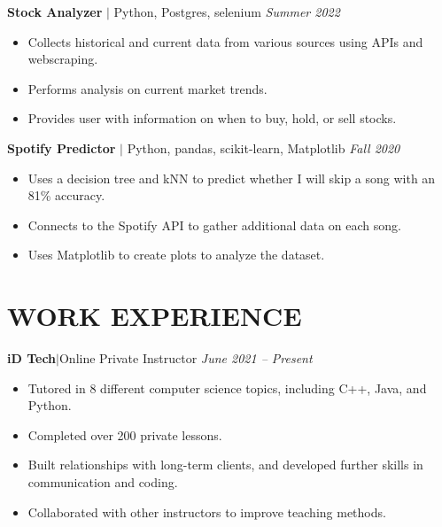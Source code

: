 \documentclass[11pt, a4paper, roman]{moderncv}
\newcommand{\project}[5]{
	\textbf{#1}
	$|$ #3 
	\hfill\textit{#4}
	#5
	\vspace{2mm}
}
\newcommand{\entry}[4]{
	\textbf{#1}\:$|$\:#2 
	\hfill\textit{#3}
	#4
	\vspace{2mm}
}
\begin{document}
{\project{Stock Analyzer}{}{Python, Postgres, selenium}{Summer 2022}
	{\begin{itemize}
		\item Collects historical and current data from various sources using APIs and webscraping.
		\item Performs analysis on current market trends.
		\item Provides user with information on when to buy, hold, or sell stocks.
	\end{itemize}}

{\project{Spotify Predictor}{https://github.com/GoneSahlin/CPSC222Final}{Python, pandas, scikit-learn, Matplotlib}{Fall 2020}
	{\begin{itemize}
    		\item Uses a decision tree and kNN to predict whether I will skip a song with an 81\% accuracy.
    		\item Connects to the Spotify API to gather additional data on each song.
   		 \item Uses Matplotlib to create plots to analyze the dataset.
	\end{itemize}}
}

\section{WORK EXPERIENCE}

\entry{iD Tech}{Online Private Instructor}{June 2021 -- Present}
{\begin{itemize}
    \item Tutored in 8 different computer science topics, including C++, Java, and Python.
    \item Completed over 200 private lessons.
    \item Built relationships with long-term clients, and developed further skills in communication and coding.
    \item Collaborated with other instructors to improve teaching methods.
  \end{itemize}
}


}
\end{document}
